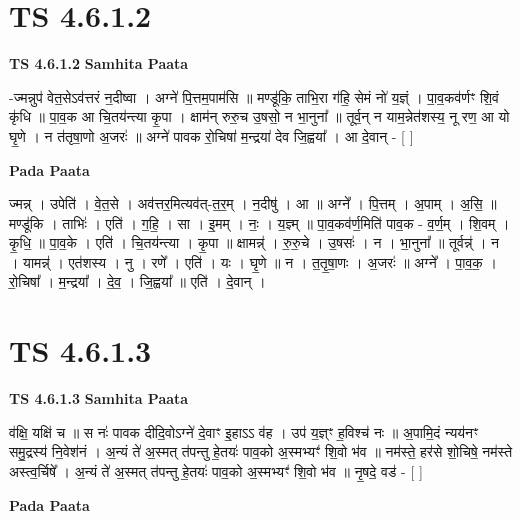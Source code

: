 \documentclass[17pt]{extarticle}
\begin{document}

\section{ TS 4.6.1.2 }

\textbf{TS 4.6.1.2 } \newline
\textbf{Samhita Paata} \newline

-ज्मन्नुप॑ वेत॒सेऽव॑त्तरं न॒दीष्वा । अग्ने॑ पि॒त्तम॒पाम॑सि ॥ मण्डू॑कि॒ ताभि॒रा ग॑हि॒ सेमं नो॑ य॒ज्ञ्ं । पा॒व॒कव॑र्णꣳ शि॒वं कृ॑धि ॥ पा॒व॒क आ चि॒तय॑न्त्या कृ॒पा । क्षाम॑न् रुरु॒च उ॒षसो॒ न भा॒नुना᳚ ॥ तूर्व॒न् न याम॒न्नेत॑शस्य॒ नू रण॒ आ यो घृ॒णे । न त॑तृषा॒णो अ॒जरः॑ ॥ अग्ने॑ पावक रो॒चिषा॑ म॒न्द्रया॑ देव जि॒ह्वया᳚ । आ दे॒वान् - [  ] \newline

\textbf{Pada Paata} \newline

ज्मन्न् । उपेति॑ । वे॒त॒से । अव॑त्तर॒मित्यव॑त्-त॒र॒म् । न॒दीषु॑ । आ ॥ अग्ने᳚ । पि॒त्तम् । अ॒पाम् । अ॒सि॒ ॥ मण्डू॑कि । ताभिः॑ । एति॑ । ग॒हि॒ । सा । इ॒मम् । नः॒ । य॒ज्ञ्म् ॥ पा॒व॒कव॑र्ण॒मिति॑ पाव॒क - व॒र्ण॒म् । शि॒वम् । कृ॒धि॒ ॥ पा॒व॒के । एति॑ । चि॒तय॑न्त्या । कृ॒पा ॥ क्षामन्न्॑ । रु॒रु॒चे । उ॒षसः॑ । न । भा॒नुना᳚ ॥ तूर्वन्न्॑ । न । यामन्न्॑ । एत॑शस्य । नु । रणे᳚ । एति॑ । यः । घृ॒णे ॥ न । त॒तृ॒षा॒णः । अ॒जरः॑ ॥ अग्ने᳚ । पा॒व॒क॒ । रो॒चिषा᳚ । म॒न्द्रया᳚ । दे॒व॒ । जि॒ह्वया᳚ ॥ एति॑ । दे॒वान् ।  \newline





\section{ TS 4.6.1.3 }

\textbf{TS 4.6.1.3 } \newline
\textbf{Samhita Paata} \newline

व॑क्षि॒ यक्षि॑ च ॥ स नः॑ पावक दीदि॒वोऽग्ने॑ दे॒वाꣳ इ॒हाऽऽ व॑ह । उप॑ य॒ज्ञ्ꣳ ह॒विश्च॑ नः ॥ अ॒पामि॒दं न्यय॑नꣳ समु॒द्रस्य॑ नि॒वेश॑नं । अ॒न्यं ते॑ अ॒स्मत् त॑पन्तु हे॒तयः॑ पाव॒को अ॒स्मभ्यꣳ॑ शि॒वो भ॑व ॥ नम॑स्ते॒ हर॑से शो॒चिषे॒ नम॑स्ते अस्त्व॒र्चिषे᳚ । अ॒न्यं ते॑ अ॒स्मत् त॑पन्तु हे॒तयः॑ पाव॒को अ॒स्मभ्यꣳ॑ शि॒वो भ॑व ॥ नृ॒षदे॒ वड॑ - [  ] \newline

\textbf{Pada Paata} \newline
\end{document}
